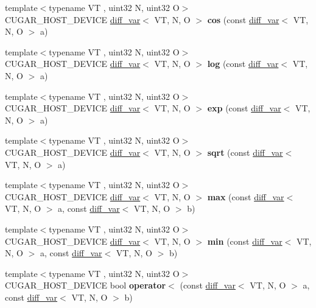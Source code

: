\begin{DoxyCompactItemize}
\item 
{\footnotesize template$<$typename VT , uint32 N, uint32 O$>$ }\\C\+U\+G\+A\+R\+\_\+\+H\+O\+S\+T\+\_\+\+D\+E\+V\+I\+CE \hyperlink{structcugar_1_1diff__var}{diff\+\_\+var}$<$ VT, N, O $>$ {\bfseries cos} (const \hyperlink{structcugar_1_1diff__var}{diff\+\_\+var}$<$ VT, N, O $>$ a)
\item 
{\footnotesize template$<$typename VT , uint32 N, uint32 O$>$ }\\C\+U\+G\+A\+R\+\_\+\+H\+O\+S\+T\+\_\+\+D\+E\+V\+I\+CE \hyperlink{structcugar_1_1diff__var}{diff\+\_\+var}$<$ VT, N, O $>$ {\bfseries log} (const \hyperlink{structcugar_1_1diff__var}{diff\+\_\+var}$<$ VT, N, O $>$ a)
\item 
{\footnotesize template$<$typename VT , uint32 N, uint32 O$>$ }\\C\+U\+G\+A\+R\+\_\+\+H\+O\+S\+T\+\_\+\+D\+E\+V\+I\+CE \hyperlink{structcugar_1_1diff__var}{diff\+\_\+var}$<$ VT, N, O $>$ {\bfseries exp} (const \hyperlink{structcugar_1_1diff__var}{diff\+\_\+var}$<$ VT, N, O $>$ a)
\item 
{\footnotesize template$<$typename VT , uint32 N, uint32 O$>$ }\\C\+U\+G\+A\+R\+\_\+\+H\+O\+S\+T\+\_\+\+D\+E\+V\+I\+CE \hyperlink{structcugar_1_1diff__var}{diff\+\_\+var}$<$ VT, N, O $>$ {\bfseries sqrt} (const \hyperlink{structcugar_1_1diff__var}{diff\+\_\+var}$<$ VT, N, O $>$ a)
\item 
{\footnotesize template$<$typename VT , uint32 N, uint32 O$>$ }\\C\+U\+G\+A\+R\+\_\+\+H\+O\+S\+T\+\_\+\+D\+E\+V\+I\+CE \hyperlink{structcugar_1_1diff__var}{diff\+\_\+var}$<$ VT, N, O $>$ {\bfseries max} (const \hyperlink{structcugar_1_1diff__var}{diff\+\_\+var}$<$ VT, N, O $>$ a, const \hyperlink{structcugar_1_1diff__var}{diff\+\_\+var}$<$ VT, N, O $>$ b)
\item 
{\footnotesize template$<$typename VT , uint32 N, uint32 O$>$ }\\C\+U\+G\+A\+R\+\_\+\+H\+O\+S\+T\+\_\+\+D\+E\+V\+I\+CE \hyperlink{structcugar_1_1diff__var}{diff\+\_\+var}$<$ VT, N, O $>$ {\bfseries min} (const \hyperlink{structcugar_1_1diff__var}{diff\+\_\+var}$<$ VT, N, O $>$ a, const \hyperlink{structcugar_1_1diff__var}{diff\+\_\+var}$<$ VT, N, O $>$ b)
\item 
{\footnotesize template$<$typename VT , uint32 N, uint32 O$>$ }\\C\+U\+G\+A\+R\+\_\+\+H\+O\+S\+T\+\_\+\+D\+E\+V\+I\+CE bool {\bfseries operator$<$} (const \hyperlink{structcugar_1_1diff__var}{diff\+\_\+var}$<$ VT, N, O $>$ a, const \hyperlink{structcugar_1_1diff__var}{diff\+\_\+var}$<$ VT, N, O $>$ b)

\end{DoxyCompactItemize}
